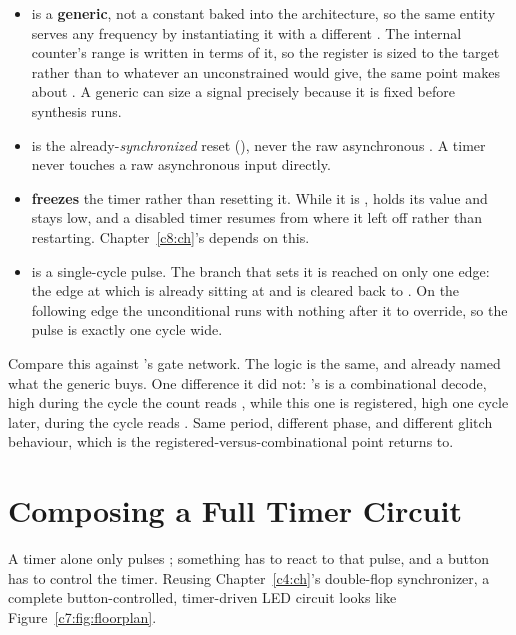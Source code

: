 \begin{itemize}
  \item {} is a \textbf{generic}, not a constant baked into the architecture, so the
    same entity serves any frequency by instantiating it with a different . The
    internal counter's range is written in terms of it, so the register is sized to the target
    rather than to whatever an unconstrained  would give, the same point
     makes about . A generic can size a signal precisely
    because it is fixed before synthesis runs.
  \item {} is the already-\emph{synchronized} reset (), never the raw
    asynchronous . A timer never touches a raw asynchronous input directly.
  \item {} \textbf{freezes} the timer rather than resetting it. While it is ,
     holds its value and  stays low, and a disabled timer resumes from
    where it left off rather than restarting. Chapter~\ref{c8:ch}'s  depends on this.
  \item {} is a single-cycle pulse. The  branch that sets it is reached on
    only one edge: the edge at which  is already sitting at  and is
    cleared back to . On the following edge the unconditional  runs
    with nothing after it to override, so the pulse is exactly one cycle wide.
\end{itemize}
Compare this against 's gate network. The logic is the same, and 
already named what the generic buys. One difference it did not: 's  is
a combinational decode, high during the cycle the count reads , while this one is
registered, high one cycle later, during the cycle  reads . Same period,
different phase, and different glitch behaviour, which is the registered-versus-combinational point
 returns to.

\section{Composing a Full Timer Circuit}
\label{c7:a4}
A timer alone only pulses ; something has to react to that pulse, and a button has to
control the timer. Reusing Chapter~\ref{c4:ch}'s double-flop synchronizer, a complete
button-controlled, timer-driven LED circuit looks like Figure~\ref{c7:fig:floorplan}.

